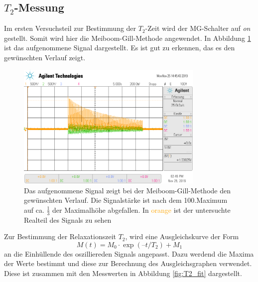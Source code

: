 \subsection{$T_2$-Messung}
Im ersten Versuchsteil zur Bestimmung der $T_2$-Zeit wird der MG-Schalter auf \textit{on} gestellt. Somit 
wird hier die Meiboom-Gill-Methode angewendet.
In Abbildung \ref{fig:t2} ist das aufgenommene Signal dargestellt. Es ist gut zu erkennen, das es den gewünschten Verlauf zeigt.
\begin{figure}[H]
  \centering
  \includegraphics[width=0.8\textwidth]{../data/T2.png}
  \caption{Das aufgenommene Signal zeigt bei der Meiboom-Gill-Methode den gewünschten Verlauf. Die Signalstärke ist nach dem
  100.Maximum auf ca. $\frac{1}{3}$ der Maximalhöhe abgefallen. In \textcolor{orange}{orange} ist der untersuchte 
  Realteil des Signals zu sehen}
  \label{fig:t2}
\end{figure} \noindent
Zur Bestimmung der Relaxationszeit $T_2$, wird eine Ausgleichskurve der Form
\begin{equation}
  M(t) = M_0 \cdot \exp(–t/T_2) + M_1
\end{equation}
an die Einhüllende des oszilliereden Signals angepasst.
Dazu werdend die Maxima der Werte bestimmt und diese zur Berechnung des Ausgleichsgraphen verwendet.
Diese ist zusammen mit den Messwerten in Abbildung \ref{fig:T2_fit}
dargestellt.
